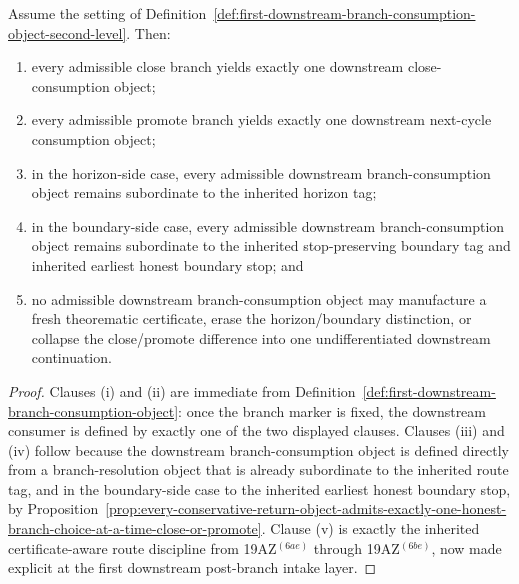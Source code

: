 \begin{proposition}
\label{prop:every-honest-branch-resolution-object-yields-exactly-one-route-faithful-downstream-branch-consumption-object}
Assume the setting of Definition~\ref{def:first-downstream-branch-consumption-object-second-level}. Then:
\begin{enumerate}[label=(\roman*)]
  \item every admissible close branch yields exactly one downstream close-consumption object;
  \item every admissible promote branch yields exactly one downstream next-cycle consumption object;
  \item in the horizon-side case, every admissible downstream branch-consumption object remains subordinate to the inherited horizon tag;
  \item in the boundary-side case, every admissible downstream branch-consumption object remains subordinate to the inherited stop-preserving boundary tag and inherited earliest honest boundary stop; and
  \item no admissible downstream branch-consumption object may manufacture a fresh theorematic certificate, erase the horizon/boundary distinction, or collapse the close/promote difference into one undifferentiated downstream continuation.
\end{enumerate}
\end{proposition}

\begin{proof}
Clauses (i) and (ii) are immediate from Definition~\ref{def:first-downstream-branch-consumption-object}: once the branch marker is fixed, the downstream consumer is defined by exactly one of the two displayed clauses. Clauses (iii) and (iv) follow because the downstream branch-consumption object is defined directly from a branch-resolution object that is already subordinate to the inherited route tag, and in the boundary-side case to the inherited earliest honest boundary stop, by Proposition~\ref{prop:every-conservative-return-object-admits-exactly-one-honest-branch-choice-at-a-time-close-or-promote}. Clause (v) is exactly the inherited certificate-aware route discipline from 19AZ$^{(6ae)}$ through 19AZ$^{(6be)}$, now made explicit at the first downstream post-branch intake layer.
\end{proof}

